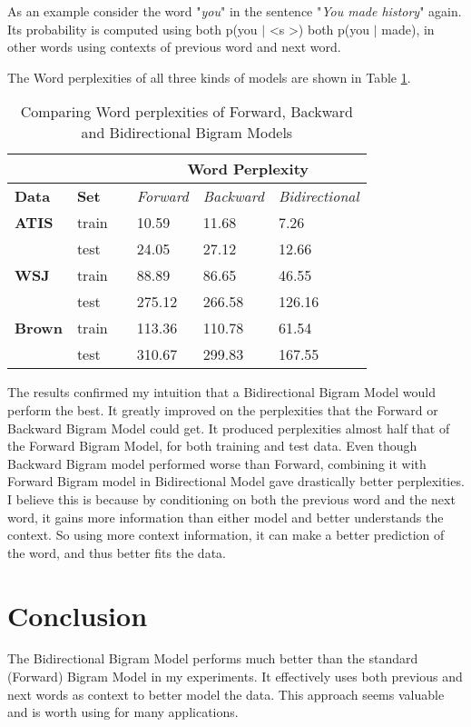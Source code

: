 \documentclass{article}
\begin{document}
As an example consider the word "\textit{you}" in the sentence "\textit{You made history}" again. Its probability is computed using both p(you $|$ \textless s \textgreater) both p(you $|$ made), in other words using contexts of previous word and next word.



The Word perplexities of all three kinds of models are shown in Table \ref{all}.
\begin{table}[h]
\centering
\begin{tabular}{@{}llllll@{}}
\toprule
\textbf{}      & \textbf{}    &  & \multicolumn{3}{c}{\textbf{Word Perplexity}}                  \\ \midrule
\textbf{Data}  & \textbf{Set} &  & \textit{Forward} & \textit{Backward} & \textit{Bidirectional} \\ \midrule
\textbf{ATIS}  & train        &  & 10.59           & 11.68             & 7.26                  \\ \midrule
               & test         &  & 24.05           & 27.12            & 12.66                 \\ \midrule
\textbf{WSJ}   & train        &  & 88.89           & 86.65            & 46.55                 \\ \midrule
               & test         &  & 275.12           & 266.58           & 126.16                \\ \midrule
\textbf{Brown} & train        &  & 113.36          & 110.78            & 61.54                  \\ \midrule
               & test         &  & 310.67          & 299.83           & 167.55               \\ \bottomrule
\end{tabular}
\caption{Comparing Word perplexities of Forward, Backward and Bidirectional Bigram Models}
\label{all}
\end{table}

The results confirmed my intuition that a Bidirectional Bigram Model would perform the best. It greatly improved on the perplexities that the Forward or Backward Bigram Model could get. It produced perplexities almost half that of the Forward Bigram Model, for both training and test data. Even though Backward Bigram model performed worse than Forward, combining it with Forward Bigram model in Bidirectional Model gave drastically better perplexities. I believe this is because by conditioning on both the previous word and the next word, it gains more information than either model and better understands the context. So using more context information, it can make a better prediction of the word, and thus better fits the data. 
\section{Conclusion}
The Bidirectional Bigram Model performs much better than the standard (Forward) Bigram Model in my experiments. It effectively uses both previous and next words as context to better model the data. This approach seems valuable and is worth using for many applications.
\end{document}
